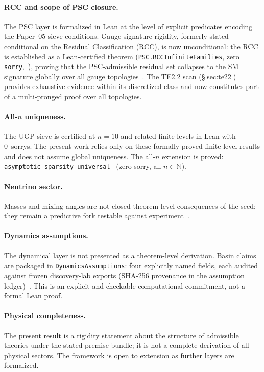 \documentclass[11pt,twocolumn]{article}
\theoremstyle{remark}
\begin{document}
\paragraph{RCC and scope of PSC closure.}
The PSC layer is formalized in Lean at the level of explicit predicates encoding the Paper~05
sieve conditions.
Gauge-signature rigidity, formerly stated conditional on the Residual Classification (RCC),
is now unconditional: the RCC is established as a Lean-certified theorem
(\texttt{PSC.RCCInfiniteFamilies}, zero \texttt{sorry},~\cite{ugp-lean}),
proving that the PSC-admissible residual set collapses to the SM signature globally over all gauge
topologies~\cite{unified-rigidity-lean}.
The TE2.2 scan (§\ref{sec:te22}) provides exhaustive evidence within its discretized class
and now constitutes part of a multi-pronged proof over all topologies.

\paragraph{All-$n$ uniqueness.}
The UGP sieve is certified at $n=10$ and related finite levels in Lean with 0~sorrys.
The present work relies only on these formally proved finite-level results and does not assume
global uniqueness.
The all-$n$ extension is proved: \texttt{asymptotic\_sparsity\_universal}~\cite{Spivack2026_Uniqueness25,ugp-lean} (zero sorry, all $n\in\mathbb{N}$).

\paragraph{Neutrino sector.}
Masses and mixing angles are not closed theorem-level consequences of the seed; they remain a
predictive fork testable against experiment~\cite{ParticleDataGroup2022}.

\paragraph{Dynamics assumptions.}
The dynamical layer is not presented as a theorem-level derivation.
Basin claims are packaged in \texttt{DynamicsAssumptions}: four explicitly named fields,
each audited against frozen discovery-lab exports (SHA-256 provenance in the assumption
ledger)~\cite{unified-rigidity-lean,ugp-physics-repo}.
This is an explicit and checkable computational commitment, not a formal Lean proof.

\paragraph{Physical completeness.}
The present result is a rigidity statement about the structure of admissible theories under
the stated premise bundle; it is not a complete derivation of all physical sectors.
The framework is open to extension as further layers are formalized.
\end{document}
